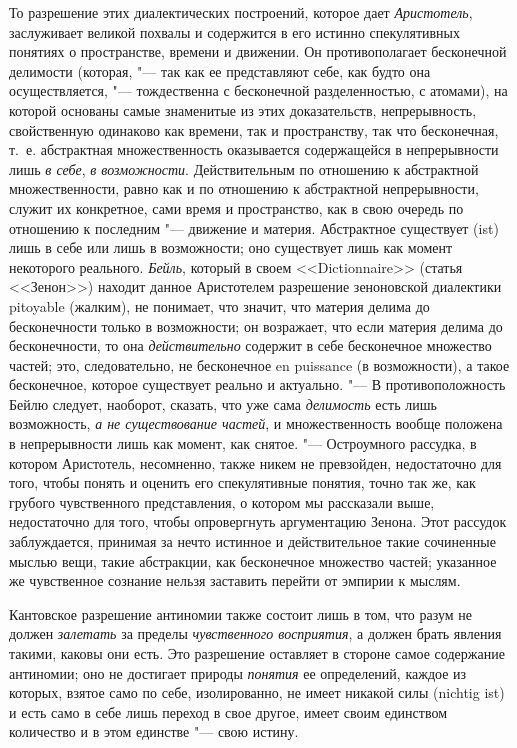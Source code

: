 То разрешение этих диалектических построений, которое дает
{\em Аристотель}, заслуживает великой похвалы и
содержится в его истинно спекулятивных понятиях о пространстве, времени и
движении. Он противополагает бесконечной делимости (которая, "--- так как ее
представляют себе, как будто она осуществляется, "--- тождественна с
бесконечной разделенностью, с атомами), на которой основаны самые
знаменитые из этих доказательств, непрерывность, свойственную одинаково как
времени, так и пространству, так что бесконечная, т.~е. абстрактная
множественность оказывается содержащейся в непрерывности лишь
{\em в себе}, {\em в возможности}.
Действительным по отношению к абстрактной множественности, равно как и по
отношению к абстрактной непрерывности, служит их конкретное, сами время и
пространство, как в свою очередь по отношению к последним "--- движение и
материя. Абстрактное существует (ist) лишь в себе или лишь в возможности;
оно существует лишь как момент некоторого реального.
{\em Бейль}, который в своем <<Dictionnaire>> (статья
<<Зенон>>) находит данное Аристотелем разрешение зеноновской диалектики
pitoyable (жалким), не понимает, что значит, что материя делима до
бесконечности только в возможности; он возражает, что если материя делима
до бесконечности, то она {\em действительно} содержит в
себе бесконечное множество частей; это, следовательно, не бесконечное en
puissance (в возможности), а такое бесконечное, которое существует реально
и актуально. "--- В противоположность Бейлю следует, наоборот, сказать, что
уже сама {\em делимость} есть лишь возможность,
{\em а не существование частей}, и множественность
вообще положена в непрерывности лишь как момент, как снятое. "--- Остроумного
рассудка, в котором Аристотель, несомненно, также никем не превзойден,
недостаточно для того, чтобы понять и оценить его спекулятивные понятия,
точно так же, как грубого чувственного представления, о котором мы
рассказали выше, недостаточно для того, чтобы опровергнуть аргументацию
Зенона. Этот рассудок заблуждается, принимая за нечто истинное и
действительное такие сочиненные мыслью вещи, такие абстракции, как
бесконечное множество частей; указанное же чувственное сознание нельзя
заставить перейти от эмпирии к мыслям.

Кантовское разрешение антиномии также состоит лишь в том, что разум не
должен {\em залетать} за пределы
{\em чувственного восприятия}, а должен брать явления
такими, каковы они есть. Это разрешение оставляет в стороне самое
содержание антиномии; оно не достигает природы
{\em понятия} ее определений, каждое из которых, взятое
само по себе, изолированно, не имеет никакой силы (nichtig ist) и есть само
в себе лишь переход в свое другое, имеет своим единством количество и в
этом единстве "--- свою истину.

